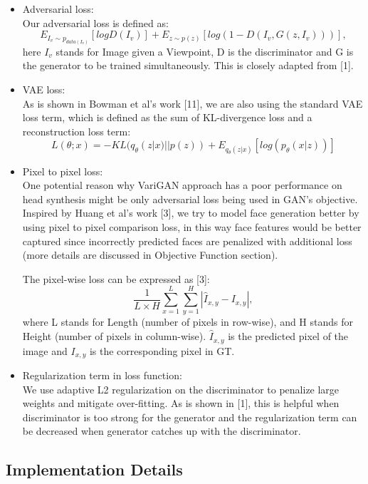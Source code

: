 \documentclass[10pt,conference]{IEEEtran}
\begin{document}
\begin{itemize}
\item Adversarial loss:\\
Our adversarial loss is defined as:
$$ E_{I_v \sim p_{data(I_v)}}[log D(I_v)] + E_{z \sim p(z)}[log (1- D(I_v, G(z, I_v)))], $$
here $I_v$ stands for Image given a Viewpoint, D is the discriminator and G is the generator to be trained simultaneously. This is closely adapted from [1].

\item VAE loss:\\
As is shown in Bowman et al's work [11], we are also using the standard VAE loss term, which is defined as the sum of KL-divergence loss and a reconstruction loss term:
$$ L(\theta;x)= -KL(q_\theta(z|x)||p(z))+E_{q_\theta(z|x)}[log(p_\theta(x|z))] $$

\item Pixel to pixel loss:\\
One potential reason why VariGAN approach has a poor performance on head synthesis might be only adversarial loss being used in GAN's objective. Inspired by Huang et al's work [3], we try to model face generation better by using pixel to pixel comparison loss, in this way face features would be better captured since incorrectly predicted faces are penalized with additional loss (more details are discussed in Objective Function section).

The pixel-wise loss can be expressed as [3]:
$$ \frac{1}{L \times H} \sum_{x=1}^L \sum_{y=1}^H |\hat{I}_{x,y}- I_{x,y}|, $$
where L stands for Length (number of pixels in row-wise), and H stands for Height (number of pixels in column-wise). $\hat{I}_{x,y}$ is the predicted pixel of the image and $I_{x,y}$ is the corresponding pixel in GT.

\item Regularization term in loss function:\\
We use adaptive L2 regularization on the discriminator to penalize large weights and mitigate over-fitting. As is shown in [1], this is helpful when discriminator is too strong for the generator and the regularization term can be decreased when generator catches up with the discriminator.

\end{itemize}


\subsection{Implementation Details}
\end{document}
